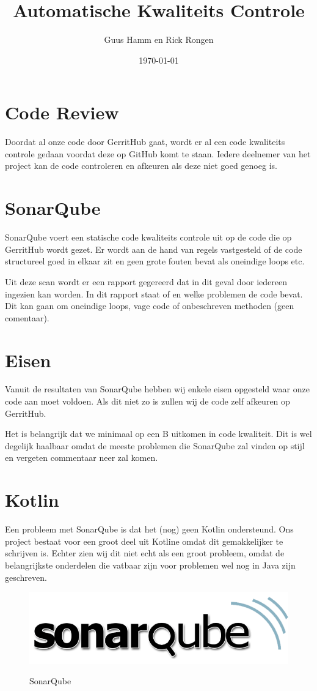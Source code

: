 \documentclass{scrreprt}
\title{Automatische Kwaliteits Controle}
\author{Guus Hamm en Rick Rongen}
\date{\today}
\begin{document}
	\maketitle
	\tableofcontents
	\newpage
	\chapter{Code Review}
	Doordat al onze code door GerritHub gaat, wordt er al een code kwaliteits controle gedaan voordat deze op GitHub komt te staan. Iedere deelnemer van het project kan de code controleren en afkeuren als deze niet goed genoeg is.
	
	\chapter{SonarQube}
	SonarQube voert een statische code kwaliteits controle uit op de code die op GerritHub wordt gezet. Er wordt aan de hand van regels vastgesteld of de code  structureel goed in elkaar zit en geen grote fouten bevat als oneindige loops etc.
	\par
	Uit deze scan wordt er een rapport gegereerd dat in dit geval door iedereen ingezien kan worden. In dit rapport staat of en welke problemen de code bevat. Dit kan gaan om oneindige loops, vage code of onbeschreven methoden (geen comentaar).
	
	\chapter{Eisen}
	Vanuit de resultaten van SonarQube hebben wij enkele eisen opgesteld waar onze code aan moet voldoen. Als dit niet zo is zullen wij de code zelf afkeuren op GerritHub.
	\par
	Het is belangrijk dat we minimaal op een B uitkomen in code kwaliteit. Dit is wel degelijk haalbaar omdat de meeste problemen die SonarQube zal vinden op stijl en vergeten commentaar neer zal komen.
	
	\newpage
	\chapter{Kotlin}
	Een probleem met SonarQube is dat het (nog) geen Kotlin ondersteund. Ons project bestaat voor een groot deel uit Kotline omdat dit gemakkelijker te schrijven is. Echter zien wij dit niet echt als een groot probleem, omdat de belangrijkste onderdelen die vatbaar zijn voor problemen wel nog in Java zijn geschreven.
	
	\begin{figure}[ht]
		\centering
		\includegraphics[width=.8\linewidth]{sonarqube}
		\label{sonarqube}
		\caption{SonarQube}
	\end{figure}
\end{document}
